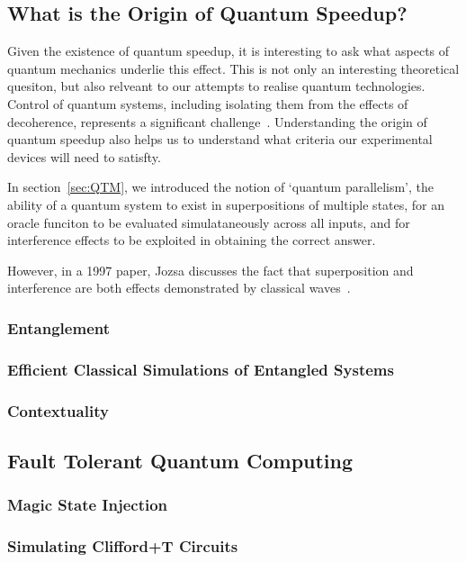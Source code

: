 \documentclass{standalone}
\begin{document}
\subsection{What is the Origin of Quantum Speedup?}
Given the existence of quantum speedup, it is interesting to ask what aspects of quantum mechanics underlie this effect. This is not only an interesting theoretical quesiton, but also relveant to our attempts to realise quantum technologies. Control of quantum systems, including isolating them from the effects of decoherence, represents a significant challenge~\cite{Shor1997}. Understanding the origin of quantum speedup also helps us to understand what criteria our experimental devices will need to satisfty.
\par
In section~\ref{sec:QTM}, we introduced the notion of `quantum parallelism', the ability of a quantum system to exist in superpositions of multiple states, for an oracle funciton to be evaluated simulataneously across all inputs, and for interference effects to be exploited in obtaining the correct answer.
\par
However, in a 1997 paper, Jozsa discusses the fact that superposition and interference are both effects demonstrated by classical waves~\cite{Jozsa1997}. 
\subsubsection*{Entanglement}\label{sec:entanglement}

\subsubsection*{Efficient Classical Simulations of Entangled Systems}\label{sec:gketc}

\subsubsection*{Contextuality}\label{sec:context}

\subsection{Fault Tolerant Quantum Computing}\label{sec:FTQC}

\subsubsection*{Magic State Injection}\label{sec:MSI}

\subsubsection*{Simulating Clifford+T Circuits}\label{sec:CHP}

\ifstandalone

\fi
\end{document}
